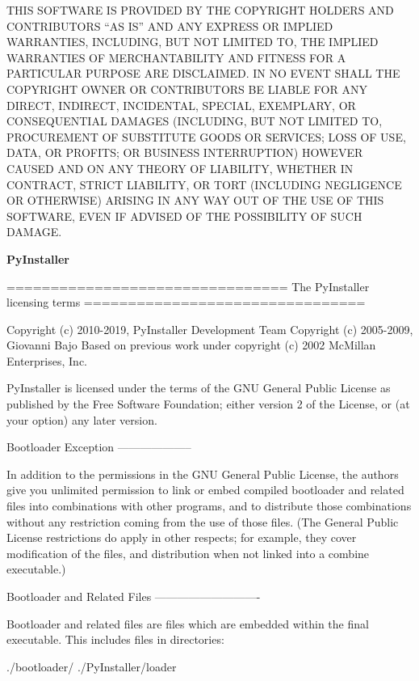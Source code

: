 THIS SOFTWARE IS PROVIDED BY THE COPYRIGHT HOLDERS AND CONTRIBUTORS “AS IS” AND ANY EXPRESS OR IMPLIED WARRANTIES, INCLUDING, BUT NOT LIMITED TO, THE IMPLIED WARRANTIES OF MERCHANTABILITY AND FITNESS FOR A PARTICULAR PURPOSE ARE DISCLAIMED. IN NO EVENT SHALL THE COPYRIGHT OWNER OR CONTRIBUTORS BE LIABLE FOR ANY DIRECT, INDIRECT, INCIDENTAL, SPECIAL, EXEMPLARY, OR CONSEQUENTIAL DAMAGES (INCLUDING, BUT NOT LIMITED TO, PROCUREMENT OF SUBSTITUTE GOODS OR SERVICES; LOSS OF USE, DATA, OR PROFITS; OR BUSINESS INTERRUPTION) HOWEVER CAUSED AND ON ANY THEORY OF LIABILITY, WHETHER IN CONTRACT, STRICT LIABILITY, OR TORT (INCLUDING NEGLIGENCE OR OTHERWISE) ARISING IN ANY WAY OUT OF THE USE OF THIS SOFTWARE, EVEN IF ADVISED OF THE POSSIBILITY OF SUCH DAMAGE.

\textbf{PyInstaller}

================================\newline
The PyInstaller licensing terms\newline
================================

Copyright (c) 2010-2019, PyInstaller Development Team\newline
Copyright (c) 2005-2009, Giovanni Bajo\newline
Based on previous work under copyright (c) 2002 McMillan Enterprises, Inc.

PyInstaller is licensed under the terms of the GNU General Public License
as published by the Free Software Foundation; either version 2 of the License,
or (at your option) any later version.

Bootloader Exception\newline
--------------------

In addition to the permissions in the GNU General Public License, the
authors give you unlimited permission to link or embed compiled bootloader
and related files into combinations with other programs, and to distribute
those combinations without any restriction coming from the use of those
files. (The General Public License restrictions do apply in other respects;
for example, they cover modification of the files, and distribution when
not linked into a combine executable.)

Bootloader and Related Files\newline
----------------------------

Bootloader and related files are files which are embedded within the
final executable. This includes files in directories:

./bootloader/\newline
./PyInstaller/loader

